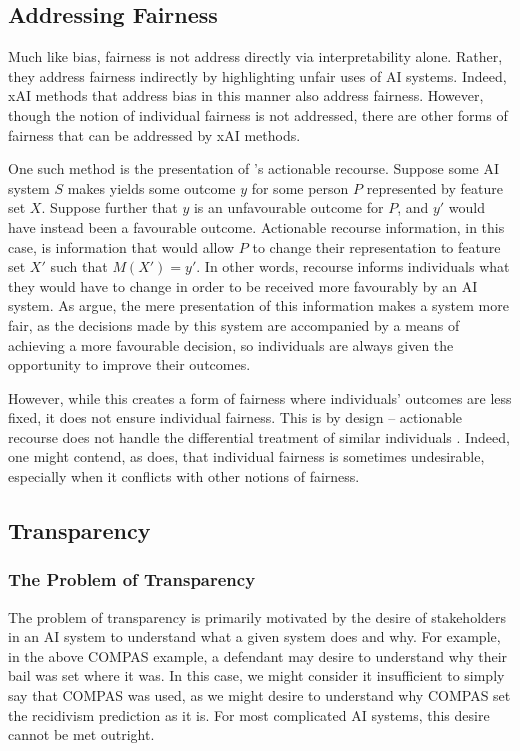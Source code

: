 \subsection{Addressing Fairness}
Much like bias, fairness is not address directly via interpretability alone. Rather, they address fairness indirectly by highlighting unfair uses of AI systems. Indeed, xAI methods that address bias in this manner also address fairness. However, though the notion of individual fairness is not addressed, there are other forms of fairness that can be addressed by xAI methods.

One such method is the presentation of \textcite{ustun_actionable_2019}'s actionable recourse. Suppose some AI system $S$ makes yields some outcome $y$ for some person $P$ represented by feature set $X$. Suppose further that $y$ is an unfavourable outcome for $P$, and $y'$ would have instead been a favourable outcome. Actionable recourse information, in this case, is information that would allow $P$ to change their representation to feature set $X'$ such that $M(X')= y'$. In other words, recourse informs individuals what they would have to change in order to be received more favourably by an AI system. As \textcite{ustun_actionable_2019} argue, the mere presentation of this information makes a system more fair, as the decisions made by this system are accompanied by a means of achieving a more favourable decision, so individuals are always given the opportunity to improve their outcomes.

However, while this creates a form of fairness where individuals' outcomes are less fixed, it does not ensure individual fairness. This is by design – actionable recourse does not handle the differential treatment of similar individuals \cite{ustun_actionable_2019}. Indeed, one might contend, as \textcite{Fleisher_2021} does, that individual fairness is sometimes undesirable, especially when it conflicts with other notions of fairness.

\subsection{Transparency}
\subsubsection{The Problem of Transparency}
The problem of transparency is primarily motivated by the desire of stakeholders in an AI system to understand what a given system does and why. For example, in the above COMPAS example, a defendant may desire to understand why their bail was set where it was. In this case, we might consider it insufficient to simply say that COMPAS was used, as we might desire to understand why COMPAS set the recidivism prediction as it is. For most complicated AI systems, this desire cannot be met outright.

